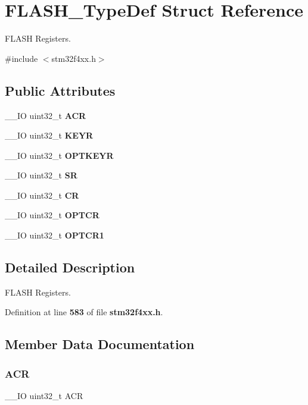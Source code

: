 \section{F\+L\+A\+S\+H\+\_\+\+Type\+Def Struct Reference}
\label{structFLASH__TypeDef}


F\+L\+A\+SH Registers.  




{\ttfamily \#include $<$stm32f4xx.\+h$>$}

\subsection*{Public Attributes}
\begin{DoxyCompactItemize}
\item 
\+\_\+\+\_\+\+IO uint32\+\_\+t \textbf{ A\+CR}
\item 
\+\_\+\+\_\+\+IO uint32\+\_\+t \textbf{ K\+E\+YR}
\item 
\+\_\+\+\_\+\+IO uint32\+\_\+t \textbf{ O\+P\+T\+K\+E\+YR}
\item 
\+\_\+\+\_\+\+IO uint32\+\_\+t \textbf{ SR}
\item 
\+\_\+\+\_\+\+IO uint32\+\_\+t \textbf{ CR}
\item 
\+\_\+\+\_\+\+IO uint32\+\_\+t \textbf{ O\+P\+T\+CR}
\item 
\+\_\+\+\_\+\+IO uint32\+\_\+t \textbf{ O\+P\+T\+C\+R1}
\end{DoxyCompactItemize}


\subsection{Detailed Description}
F\+L\+A\+SH Registers. 

Definition at line \textbf{ 583} of file \textbf{ stm32f4xx.\+h}.



\subsection{Member Data Documentation}
\mbox{\label{structFLASH__TypeDef_a9cb55206b29a8c16354747c556ab8bea}} 
\subsubsection{A\+CR}
{\footnotesize\ttfamily \+\_\+\+\_\+\+IO uint32\+\_\+t A\+CR}

